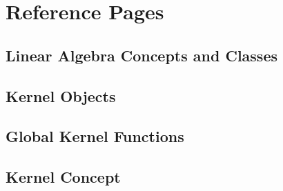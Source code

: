 
\chapter{Reference Pages}

\lcTex{}

\clearpage
\section{Linear Algebra Concepts and Classes}
\gdef\ccRefPageBreak{\ccFalse}

\gdef\ccRefPageBreak{\ccTrue}





\clearpage
\section{Kernel Objects}
\gdef\ccRefPageBreak{\ccFalse}


\gdef\ccRefPageBreak{\ccTrue}












\clearpage
\section{Global Kernel Functions}
\gdef\ccRefPageBreak{\ccFalse}


\gdef\ccRefPageBreak{\ccTrue}





















\clearpage
\section{Kernel Concept}
\gdef\ccRefPageBreak{\ccFalse}

